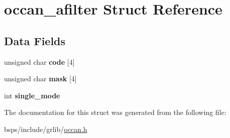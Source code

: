 \hypertarget{structoccan__afilter}{}\section{occan\+\_\+afilter Struct Reference}
\label{structoccan__afilter}
\subsection*{Data Fields}
\begin{DoxyCompactItemize}
\item 
\mbox{\label{structoccan__afilter_a238546bc2b8e89202b2ecb44ec85c420}} 
unsigned char {\bfseries code} \mbox{[}4\mbox{]}
\item 
\mbox{\label{structoccan__afilter_ab6645aac4b210fc5c97678221ee0e29f}} 
unsigned char {\bfseries mask} \mbox{[}4\mbox{]}
\item 
\mbox{\label{structoccan__afilter_af46fdf4bec08e9c020ec20a20bd62550}} 
int {\bfseries single\+\_\+mode}
\end{DoxyCompactItemize}


The documentation for this struct was generated from the following file\+:\begin{DoxyCompactItemize}
\item 
bsps/include/grlib/\mbox{\hyperlink{occan_8h}{occan.\+h}}\end{DoxyCompactItemize}
